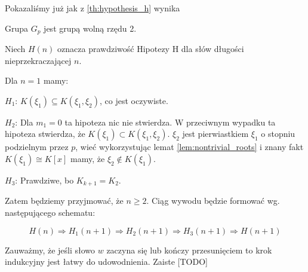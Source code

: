 Pokazaliśmy już jak z \ref{th:hypothesis_h} wynika

\begin{corollary}
  Grupa $G_p$ jest grupą wolną rzędu 2.
\end{corollary}

Niech $H(n)$ oznacza prawdziwość Hipotezy H dla słów długości nieprzekraczającej
$n$.

Dla $n=1$ mamy:
\begin{description}
  \item{$H_1$:} 
    $K\left(\xi_1\right) \subseteq K\left(\xi_1, \xi_2\right)$, co jest
    oczywiste.
  \item{$H_2$:} Dla $m_1 = 0$ ta hipoteza nic nie stwierdza. W przeciwnym
    wypadku ta hipoteza stwierdza, że $K\left(\xi_1\right) \subset K\left(\xi_1,
    \xi_2\right)$. $\xi_2$ jest pierwiastkiem $\xi_1$ o stopniu podzielnym przez
    $p$, wieć wykorzystując lemat \ref{lem:nontrivial_roots} i znany fakt
    $K\left(\xi_1\right) \cong K[x]$ mamy, że $\xi_2 \not \in
    K\left(\xi_1\right)$.
  \item{$H_3$:} Prawdziwe, bo $K_{k+1} = K_2$.

\end{description}

Zatem będziemy przyjmować, że $n \geq 2$. Ciąg wywodu będzie formować wg.
następującego schematu:

\[ H(n) \Rightarrow H_1(n+1) \Rightarrow H_2(n+1) \Rightarrow H_3(n+1)
\Rightarrow H(n+1)\]

Zauważmy, że jeśli słowo $w$ zaczyna się lub kończy przesunięciem to krok
indukcyjny jest łatwy do udowodnienia. Zaiste [TODO]
